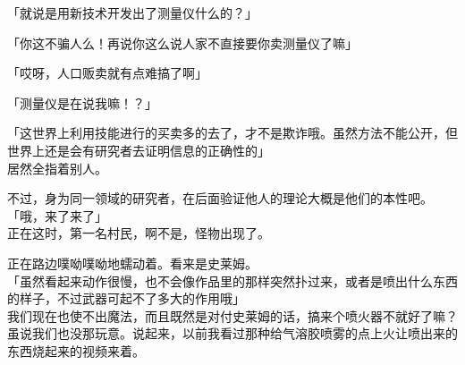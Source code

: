 「就说是用新技术开发出了测量仪什么的？」

「你这不骗人么！再说你这么说人家不直接要你卖测量仪了嘛」

「哎呀，人口贩卖就有点难搞了啊」

「测量仪是在说我嘛！？」

「这世界上利用技能进行的买卖多的去了，才不是欺诈哦。虽然方法不能公开，但世界上还是会有研究者去证明信息的正确性的」\\

居然全指着别人。

不过，身为同一领域的研究者，在后面验证他人的理论大概是他们的本性吧。\\

「哦，来了来了」\\

正在这时，第一名村民，啊不是，怪物出现了。

正在路边噗呦噗呦地蠕动着。看来是史莱姆。\\

「虽然看起来动作很慢，也不会像作品里的那样突然扑过来，或者是喷出什么东西的样子，不过武器可起不了多大的作用哦」\\

我们现在也使不出魔法，而且既然是对付史莱姆的话，搞来个喷火器不就好了嘛？虽说我们也没那玩意。说起来，以前我看过那种给气溶胶喷雾的点上火让喷出来的东西烧起来的视频来着。\\


